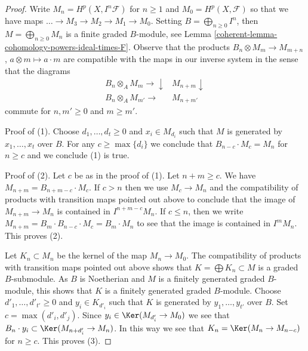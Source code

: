 \begin{proof}

Write $M_n = H^p(X, I^n\mathcal{F})$ for $n \geq 1$ and
$M_0 = H^p(X, \mathcal{F})$ so that we have maps
$\ldots \to M_3 \to M_2 \to M_1 \to M_0$. Setting
$B = \bigoplus_{n \geq 0} I^n$, then $M = \bigoplus_{n \geq 0} M_n$
is a finite graded $B$-module, see
Lemma \ref{coherent-lemma-cohomology-powers-ideal-times-F}.
Observe that the products
$B_n \otimes M_m \to M_{m + n}$, $a \otimes m \mapsto a \cdot m$
are compatible with the maps in our inverse system in the sense
that the diagrams
$$
\begin{array}{cc}B_n \otimes_A M_m \longrightarrow\downarrow & M_{n + m} \downarrow \\ B_n \otimes_A M_{m'} \longrightarrow & M_{n + m'}\end{array}
$$
commute for $n, m' \geq 0$ and $m \geq m'$.

\medskip\noindent
Proof of (1). Choose $d_1, \ldots, d_t \geq 0$ and $x_i \in M_{d_i}$
such that $M$ is generated by $x_1, \ldots, x_t$ over $B$.
For any $c \geq \max\{d_i\}$ we conclude that
$B_{n - c} \cdot M_c = M_n$ for $n \geq c$ and we conclude (1) is true.

\medskip\noindent
Proof of (2). Let $c$ be as in the proof of (1). Let $n + m \geq c$.
We have $M_{n + m} = B_{n + m - c} \cdot M_c$.
If $c > n$ then we use $M_c \to M_n$ and the compatibility of products
with transition maps pointed out above to conclude that
the image of $M_{n + m} \to M_n$ is contained in $I^{n + m - c}M_n$.
If $c \leq n$, then we write $M_{n + m} = B_m \cdot B_{n - c} \cdot M_c =
B_m \cdot M_n$ to see that the image is contained in $I^m M_n$.
This proves (2).

\medskip\noindent
Let $K_n \subset M_n$ be the kernel of the map $M_n \to M_0$. The
compatibility of products with transition maps pointed out above
shows that $K = \bigoplus K_n \subset M$ is a graded $B$-submodule.
As $B$ is Noetherian and $M$ is a finitely generated graded $B$-module,
this shows that $K$ is a finitely generated graded $B$-module.
Choose $d'_1, \ldots, d'_{t'} \geq 0$ and $y_i \in K_{d'_i}$
such that $K$ is generated by $y_1, \ldots, y_{t'}$ over $B$.
Set $c = \max(d'_i, d'_j)$. Since $y_i \in \Ker(M_{d'_i} \to M_0)$
we see that $B_n \cdot y_i \subset \Ker(M_{n + d'_i} \to M_n)$.
In this way we see that $K_n = \Ker(M_n \to M_{n - c})$ for $n \geq c$.
This proves (3).


\end{proof}

